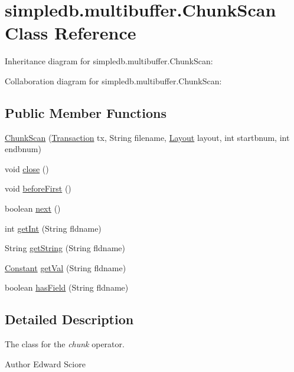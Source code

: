\hypertarget{classsimpledb_1_1multibuffer_1_1ChunkScan}{}\section{simpledb.\+multibuffer.\+Chunk\+Scan Class Reference}
\label{classsimpledb_1_1multibuffer_1_1ChunkScan}


Inheritance diagram for simpledb.\+multibuffer.\+Chunk\+Scan\+:


Collaboration diagram for simpledb.\+multibuffer.\+Chunk\+Scan\+:
\subsection*{Public Member Functions}
\begin{DoxyCompactItemize}
\item 
\hyperlink{classsimpledb_1_1multibuffer_1_1ChunkScan_a8f4dd101347e36183b0d69e6e20056dd}{Chunk\+Scan} (\hyperlink{classsimpledb_1_1tx_1_1Transaction}{Transaction} tx, String filename, \hyperlink{classsimpledb_1_1record_1_1Layout}{Layout} layout, int startbnum, int endbnum)
\item 
void \hyperlink{classsimpledb_1_1multibuffer_1_1ChunkScan_ac05118042ff2f71f455a3fc4cd5288d0}{close} ()
\item 
void \hyperlink{classsimpledb_1_1multibuffer_1_1ChunkScan_acd915cad8a1a21a0838eab8c4ee47935}{before\+First} ()
\item 
boolean \hyperlink{classsimpledb_1_1multibuffer_1_1ChunkScan_a67b28d9b880f45fe94257b483cc3093a}{next} ()
\item 
int \hyperlink{classsimpledb_1_1multibuffer_1_1ChunkScan_a60fb6e3568149c5284b80e339d3e3ffb}{get\+Int} (String fldname)
\item 
String \hyperlink{classsimpledb_1_1multibuffer_1_1ChunkScan_aa66edd9026c2c2f92015d3d6c2b9c932}{get\+String} (String fldname)
\item 
\hyperlink{classsimpledb_1_1query_1_1Constant}{Constant} \hyperlink{classsimpledb_1_1multibuffer_1_1ChunkScan_a8c5c7202add0289c7fc15f036332db96}{get\+Val} (String fldname)
\item 
boolean \hyperlink{classsimpledb_1_1multibuffer_1_1ChunkScan_ab63331aac633c7b12a5aa0401a77d2b2}{has\+Field} (String fldname)
\end{DoxyCompactItemize}


\subsection{Detailed Description}
The class for the {\itshape chunk} operator. \begin{DoxyAuthor}{Author}
Edward Sciore 
\end{DoxyAuthor}


